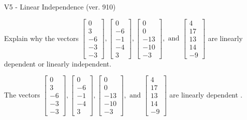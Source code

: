 \begin{exercise}
  \begin{exerciseTitle}V5 - Linear Independence (ver. 910)\end{exerciseTitle}
  \begin{exerciseStatement}
    Explain why the vectors \(\left[\begin{array}{r}
0 \\
3 \\
-6 \\
-3 \\
-3
\end{array}\right] , \left[\begin{array}{r}
0 \\
-6 \\
-1 \\
-4 \\
3
\end{array}\right] , \left[\begin{array}{r}
0 \\
0 \\
-13 \\
-10 \\
-3
\end{array}\right] , \text{ and } \left[\begin{array}{r}
4 \\
17 \\
13 \\
14 \\
-9
\end{array}\right]\) are linearly dependent or linearly independent.	


  \end{exerciseStatement}
  \begin{exerciseAnswer}
   The vectors \(\left[\begin{array}{r}
0 \\
3 \\
-6 \\
-3 \\
-3
\end{array}\right] , \left[\begin{array}{r}
0 \\
-6 \\
-1 \\
-4 \\
3
\end{array}\right] , \left[\begin{array}{r}
0 \\
0 \\
-13 \\
-10 \\
-3
\end{array}\right] , \text{ and } \left[\begin{array}{r}
4 \\
17 \\
13 \\
14 \\
-9
\end{array}\right]\) are 
  	 linearly dependent  .
  


  \end{exerciseAnswer}
\end{exercise}